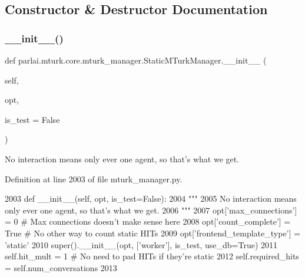 \subsection{Constructor \& Destructor Documentation}
\mbox{\label{classparlai_1_1mturk_1_1core_1_1mturk__manager_1_1StaticMTurkManager_ab5bd9c520d5aefcb52031fb8c0d2f4bc}} 
\subsubsection{\texorpdfstring{\+\_\+\+\_\+init\+\_\+\+\_\+()}{\_\_init\_\_()}}
{\footnotesize\ttfamily def parlai.\+mturk.\+core.\+mturk\+\_\+manager.\+Static\+M\+Turk\+Manager.\+\_\+\+\_\+init\+\_\+\+\_\+ (\begin{DoxyParamCaption}\item[{}]{self,  }\item[{}]{opt,  }\item[{}]{is\+\_\+test = {\ttfamily False} }\end{DoxyParamCaption})}

\begin{DoxyVerb}No interaction means only ever one agent, so that's what we get.
\end{DoxyVerb}
 

Definition at line 2003 of file mturk\+\_\+manager.\+py.


\begin{DoxyCode}
2003     \textcolor{keyword}{def }\_\_init\_\_(self, opt, is\_test=False):
2004         \textcolor{stringliteral}{"""}
2005 \textcolor{stringliteral}{        No interaction means only ever one agent, so that's what we get.}
2006 \textcolor{stringliteral}{        """}
2007         opt[\textcolor{stringliteral}{'max\_connections'}] = 0  \textcolor{comment}{# Max connections doesn't make sense here}
2008         opt[\textcolor{stringliteral}{'count\_complete'}] = \textcolor{keyword}{True}  \textcolor{comment}{# No other way to count static HITs}
2009         opt[\textcolor{stringliteral}{'frontend\_template\_type'}] = \textcolor{stringliteral}{'static'}
2010         super().\_\_init\_\_(opt, [\textcolor{stringliteral}{'worker'}], is\_test, use\_db=\textcolor{keyword}{True})
2011         self.hit\_mult = 1  \textcolor{comment}{# No need to pad HITs if they're static}
2012         self.required\_hits = self.num\_conversations
2013 
\end{DoxyCode}


